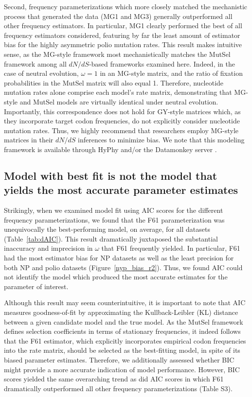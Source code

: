 \documentclass[11pt]{article}
\begin{document}
Second, frequency parameterizations which more closely matched the mechanistic process that generated the data (MG1 and MG3) generally outperformed all other frequency estimators. In particular, MG1 clearly performed the best of all frequency estimators considered, featuring by far the least amount of estimator bias for the highly asymmetric polio mutation rates. This result makes intuitive sense, as the MG-style framework most mechanistically matches the MutSel framework among all $dN/dS$-based frameworks examined here. Indeed, in the case of neutral evolution, $\omega = 1$ in an MG-style matrix, and the ratio of fixation probabilities in the MutSel matrix will also equal 1. Therefore, nucleotide mutation rates alone comprise each model's rate matrix, demonstrating that MG-style and MutSel models are virtually identical under neutral evolution. Importantly, this correspondence does not hold for GY-style matrices which, as they incorporate target codon frequencies, do not explicitly consider nucleotide mutation rates. Thus, we highly recommend that researchers employ MG-style matrices in their $dN/dS$ inferences to minimize bias. We note that this modeling framework is available through HyPhy \citep{KosakovskyPondetal2005} and/or the Datamonkey server \citep{Delport2010}.


\subsection*{Model with best fit is not the model that yields the most accurate parameter estimates}

Strikingly, when we examined model fit using AIC scores \citep{Akaike1974,BurnhamAnderson2004} for the different frequency parameterizations, we found that the F61 parameterization was unequivocally the best-performing model, on average, for all datasets (Table~\ref{tab:dAIC}). This result dramatically juxtaposed the substantial inaccuracy and imprecision in $\omega$ that F61 frequently yielded. In particular, F61 had the most estimator bias for NP datasets as well as the least precision for both NP and polio datasets (Figure~\ref{nyp_bias_r2}). Thus, we found AIC could not identify the model which produced the most accurate estimates for the parameter of interest. 

Although this result may seem counterintuitive, it is important to note that AIC measures goodness-of-fit by approximating the Kullback-Leibler (KL) distance between a given candidate model and the true model. As the MutSel framework defines selection coefficients in terms of stationary frequencies, it indeed follows that the F61 estimator, which explicitly incorporates empirical codon frequencies into the rate matrix, should be selected as the best-fitting model, in spite of its biased parameter estimates. Therefore, we additionally assessed whether BIC might provide a more accurate indication of model performance. However, BIC scores yielded the same overarching trend as did AIC scores in which F61 dramatically outperformed all other frequency parameterizations (Table S3).
\end{document}
